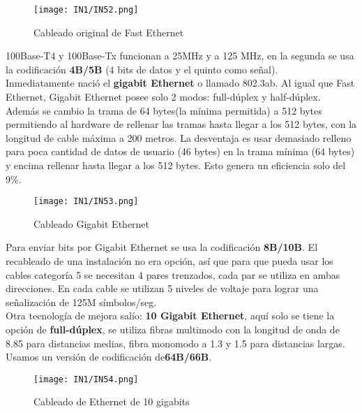 \documentclass[
	12pt, %
	fleqn, %
	a4paper, %
]{LegrandOrangeBook}
\begin{document}
\begin{figure}[H]
\centering
\texttt{[image: IN1/IN52.png]}
\caption{Cableado original de Fast Ethernet}
\end{figure}
100Base-T4 y 100Base-Tx funcionan a 25MHz y a 125 MHz, en la segunda se usa la codificación \textbf{4B/5B} (4 bits de datos y el quinto como señal). \\
Inmediatamente nació el \textbf{gigabit Ethernet} o llamado 802.3ab. Al igual que Fast Ethernet, Gigabit Ethernet posee solo 2 modos: full-dúplex y half-dúplex. Además se cambio la trama de 64 bytes(la mínima permitida) a 512 bytes permitiendo al hardware de rellenar las tramas hasta llegar a los 512 bytes, con la longitud de cable máxima a 200 metros. La desventaja es usar demasiado relleno para poca cantidad de datos de usuario (46 bytes) en la trama mínima (64 bytes) y encima rellenar hasta llegar a los 512 bytes. Esto genera un eficiencia solo del 9\%.
\begin{figure}[H]
\centering
\texttt{[image: IN1/IN53.png]}
\caption{Cableado Gigabit Ethernet}
\end{figure}
Para enviar bits por Gigabit Ethernet se usa la codificación \textbf{8B/10B}. El recableado de una instalación no era opción, así que para que pueda usar los cables categoría 5 se necesitan 4 pares trenzados, cada par se utiliza en ambas direcciones. En cada cable se utilizan 5 niveles de voltaje para lograr una señalización de 125M símbolos/seg.\\
Otra tecnología de mejora salío: \textbf{10 Gigabit Ethernet}, aquí solo se tiene la opción de \textbf{full-dúplex}, se utiliza fibras multimodo con la longitud de onda de 8.85 para distancias medias, fibra monomodo a 1.3 y 1.5 para distancias largas. Usamos un versión de codificación de\textbf{64B/66B}.
\begin{figure}[H]
\centering
\texttt{[image: IN1/IN54.png]}
\caption{Cableado de Ethernet de 10 gigabits}
\end{figure}
\end{document}
